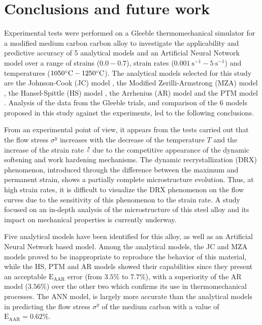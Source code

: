 \documentclass[twoside,english,1p,final,sort&compress]{elsarticle}
\theoremstyle{plain}
\DeclareRobustCommand{\mdot}[1]{\accentset{\mbox{\bfseries .}}{#1}}
\DeclareRobustCommand{\AARE}{\text{E}_\text{AAR}}
\DeclareRobustCommand{\ps}{\text{s}^{-1}}
\begin{document}
\section{Conclusions and future work\label{sec:Conclusion}}

Experimental tests were performed on a Gleeble thermomechanical simulator for a modified medium carbon carbon alloy to investigate the applicability and predictive accuracy of 5 analytical models and an Artificial Neural Network model over a range of strains ($0.0-0.7$), strain rates ($0.001~\ps-5~\ps$) and temperatures ($1050\celsius-1250\celsius$).
The analytical models selected for this study are the Johnson-Cook (JC) model \cite{Johnson-1983}, the Modified Zerilli-Armstrong (MZA) model \cite{Samantaray-2009}, the Hansel-Spittle (HS) model \cite{Hensel-1978}, the Arrhenius (AR) model \cite{Sellars-1966} and the PTM model  \cite{TizeMha-2022}.
Analysis of the data from the Gleeble trials, and comparison of the 6 models proposed in this study against the experiments, led to the following conclusions.

From an experimental point of view, it appears from the tests carried out that the flow stress $\sigma^y$ increases with the decrease of the temperature $T$ and the increase of the strain rate $\mdot\varepsilon$ due to the competitive appearance of the dynamic softening and work hardening mechanisms.
The dynamic recrystallization (DRX) phenomenon, introduced through the difference between the maximum and permanent strain, shows a partially complete microstructure evolution.
Thus, at high strain rates, it is difficult to visualize the DRX phenomenon on the flow curves due to the sensitivity of this phenomenon to the strain rate.
A study focused on an in-depth analysis of the microstructure of this steel alloy and its impact on mechanical properties is currently underway.

Five analytical models have been identified for this alloy, as well as an Artificial Neural Network based model.
Among the analytical models, the JC and MZA models proved to be inappropriate to reproduce the behavior of this material, while the HS, PTM and AR models showed their capabilities since they present an acceptable $\AARE$ error (from $3.5\%$ to $7.7\%$), with a superiority of the AR model ($3.56\%$) over the other two which confirms its use in thermomechanical processes.
The ANN model, is largely more accurate than the analytical models in predicting the flow stress $\sigma^y$ of the medium carbon with a value of $\AARE=0.62\%$.
\end{document}
